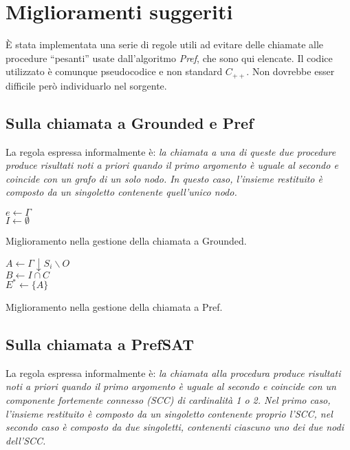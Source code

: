 \section{Miglioramenti suggeriti}
È stata implementata una serie di regole utili ad evitare delle chiamate alle
procedure ``pesanti'' usate dall'algoritmo \emph{Pref}, che sono qui elencate.
Il codice utilizzato è comunque pseudocodice e non standard $C_{++}$. Non
dovrebbe esser difficile però individuarlo nel sorgente.
\subsection{Sulla chiamata a Grounded e Pref}
La regola espressa informalmente è: \emph{la chiamata a una di queste due
procedure produce risultati noti a priori quando il primo argomento è uguale al
secondo e coincide con un grafo di un solo nodo. In questo caso, l'insieme
restituito è composto da un singoletto contenente quell'unico nodo.}

\begin{algorithm}
	\SetAlgoLined
	 {
		$e \leftarrow \Gamma$ \\
		$I \leftarrow \emptyset$
	}
	\caption{Miglioramento nella gestione della chiamata a Grounded.}
\end{algorithm}

\begin{algorithm}
	\SetAlgoLined
	$ A \leftarrow \Gamma\downarrow S_i{\backslash}O$ \\
	$ B \leftarrow I\cap C$ \\
	 { 
		$E^* \leftarrow  \{A\}$ 
	}
	\caption{Miglioramento nella gestione della chiamata a Pref.}
\end{algorithm}			
		
\subsection{Sulla chiamata a PrefSAT}
La regola espressa informalmente è: \emph{la chiamata alla procedura produce
risultati noti a priori quando il primo argomento è uguale al secondo e coincide
con un componente fortemente connesso (\emph{SCC}) di cardinalità 1 o 2. Nel
primo caso, l'insieme restituito è composto da un singoletto contenente proprio
l'\emph{SCC}, nel secondo caso è composto da due singoletti, contenenti ciascuno
uno dei due nodi dell'\emph{SCC}. }

